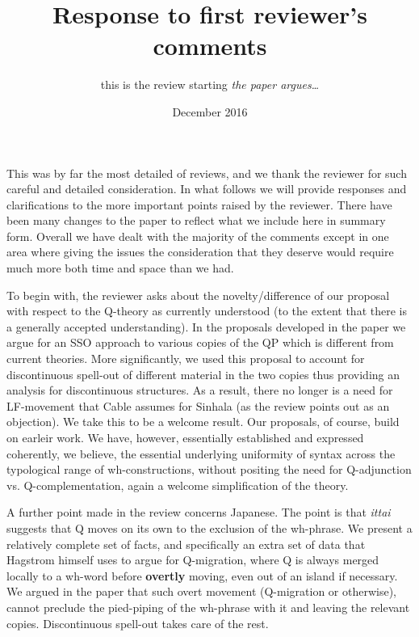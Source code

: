 \documentclass[11pt]{article}
\begin{document}
\title{Response to first reviewer's comments}
\author{this is the review starting \textit{the paper argues\ldots}}
\date{December 2016}

\maketitle
This was by far the most detailed of reviews, and we thank the reviewer for such careful and detailed consideration. In what follows  we will provide responses and clarifications to the more important points raised by the reviewer.  There have been many changes to the paper to reflect what we include here in summary form.  Overall we have dealt with the majority of the comments except in one area where giving the issues the consideration that they deserve would require much more both time and space than we had.

To begin with, the reviewer asks about the novelty/difference of our proposal with respect to the Q-theory as currently understood (to the extent that there is a generally accepted understanding).  In the proposals developed in the paper we argue for an SSO approach to various copies of the QP which is different from current theories. More significantly, we used this proposal to account for discontinuous spell-out of different material in the two copies thus providing an analysis for discontinuous structures. As a result, there no longer is a need for LF-movement that Cable assumes for Sinhala (as the review points out as an objection).  We take this to be a welcome result. Our proposals, of course, build on earleir work.  We have, however,  essentially established and expressed coherently, we believe, the essential  underlying uniformity of syntax across the typological range of wh-constructions, without positing the need for Q-adjunction vs. Q-complementation, again a welcome simplification of the theory.




\newpage




A further point made in the review concerns Japanese.   The point is that \textit{ittai} suggests that Q moves on its own to the exclusion of the wh-phrase. We present a relatively complete set of facts, and specifically an extra set of data that Hagstrom himself uses to argue for Q-migration, where Q is always merged locally to a wh-word before \textbf{overtly} moving, even out of an island if necessary. We argued in the paper that such overt movement (Q-migration or otherwise), cannot preclude the pied-piping of the wh-phrase with it and leaving the relevant copies. Discontinuous spell-out takes care of the rest.
\end{document}

